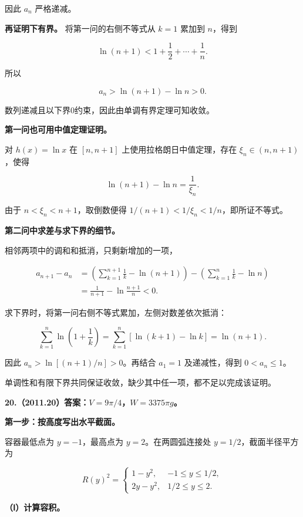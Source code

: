 \documentclass[UTF8,11pt,fontset=windows]{ctexart}
\begin{document}
因此 $a_n$ 严格递减。

\textbf{再证明下有界。} 将第一问的右侧不等式从 $k=1$ 累加到 $n$，得到

$$
\ln(n+1)<1+\frac12+\cdots+\frac1n.
$$

所以

$$
a_n>\ln(n+1)-\ln n>0.
$$

数列递减且以下界0约束，因此由单调有界定理可知收敛。

\textbf{第一问也可用中值定理证明。}

对 $h(x)=\ln x$ 在 $[n,n+1]$ 上使用拉格朗日中值定理，存在 $\xi_n\in(n,n+1)$，使得

$$
\ln(n+1)-\ln n=\frac1{\xi_n}.
$$

由于 $n<\xi_n<n+1$，取倒数便得 $1/(n+1)<1/\xi_n<1/n$，即所证不等式。

\textbf{第二问中求差与求下界的细节。}

相邻两项中的调和和抵消，只剩新增加的一项，

$$
\begin{aligned}
a_{n+1}-a_n
&=\left(\sum_{k=1}^{n+1}\frac1k-\ln(n+1)\right)
-\left(\sum_{k=1}^{n}\frac1k-\ln n\right)\\
&=\frac1{n+1}-\ln\frac{n+1}{n}<0.
\end{aligned}
$$

求下界时，将第一问右侧不等式累加，左侧对数差依次抵消：

$$
\sum_{k=1}^n\ln\left(1+\frac1k\right)
=\sum_{k=1}^n[\ln(k+1)-\ln k]
=\ln(n+1).
$$

因此 $a_n>\ln[(n+1)/n]>0$。再结合 $a_1=1$ 及递减性，得到 $0<a_n\le1$。

单调性和有限下界共同保证收敛，缺少其中任一项，都不足以完成该证明。

\clearpage

\textbf{20.（2011.20）答案：$V=9\pi/4$，$W=3375\pi g$。}

\textbf{第一步：按高度写出水平截面。}

容器最低点为 $y=-1$，最高点为 $y=2$。在两圆弧连接处 $y=1/2$，截面半径平方为

$$
R(y)^2=\begin{cases}
1-y^2,&-1\le y\le1/2,\\
2y-y^2,&1/2\le y\le2.
\end{cases}
$$

\textbf{（Ⅰ）计算容积。}
\end{document}

